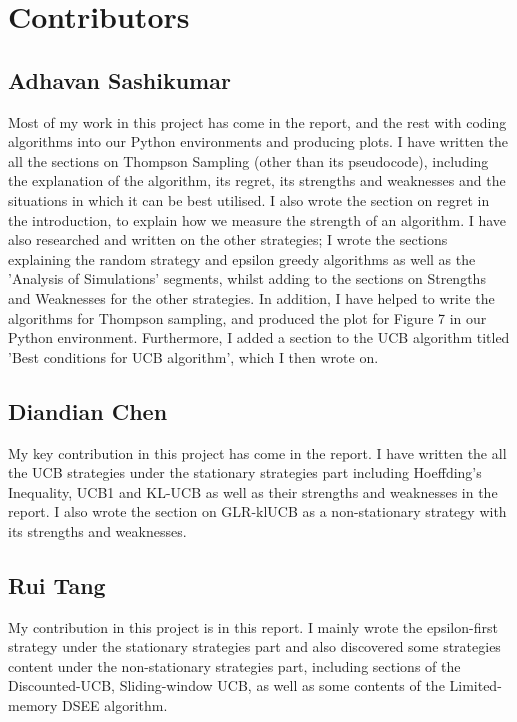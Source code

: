 \section{Contributors}\label{sec:contributors}

\subsection{Adhavan Sashikumar}\label{subsec:adhavan-sashikumar}
Most of my work in this project has come in the report, and the rest with coding algorithms into our Python environments and producing plots.
I have written the all the sections on Thompson Sampling (other than its pseudocode), including the explanation of the algorithm, its regret, its strengths and weaknesses and the situations in which it can be best utilised.
I also wrote the section on regret in the introduction, to explain how we measure the strength of an algorithm.
I have also researched and written on the other strategies;
I wrote the sections explaining the random strategy and epsilon greedy algorithms as well as the 'Analysis of Simulations' segments, whilst adding to the sections on Strengths and Weaknesses for the other strategies.
In addition, I have helped to write the algorithms for Thompson sampling, and produced the plot for Figure 7 in our Python environment.
Furthermore, I added a section to the UCB algorithm titled 'Best conditions for UCB algorithm', which I then wrote on.

\subsection{Diandian Chen}\label{subsec:diandian-chen}
My key contribution in this project has come in the report.
I have written the all the UCB strategies  under the stationary strategies part including Hoeffding's Inequality, UCB1 and KL-UCB as well as their strengths and weaknesses in the report.
I also wrote the section on GLR-klUCB as a non-stationary strategy with its strengths and weaknesses.

\subsection{Rui Tang}\label{subsec:rui-tang}
My contribution in this project is in this report.
\newline I mainly wrote the epsilon-first strategy under the stationary strategies part and also discovered some strategies content under the non-stationary strategies part, including sections of the Discounted-UCB, Sliding-window UCB, as well as  some contents of the Limited-memory DSEE algorithm.

